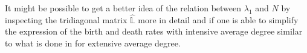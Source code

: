 \documentclass[a4paper,12pt]{scrartcl}
\begin{document}
It might be possible to get a better idea of the relation between $\lambda_1$ and $N$ by inspecting the tridiagonal matrix $\widehat{\mathbb L}$ more in detail and if one is able to simplify the expression of the birth and death rates with intensive average degree similar to what is done in \cite{PhysRevE.79.046104} for extensive average degree.



\end{document}

